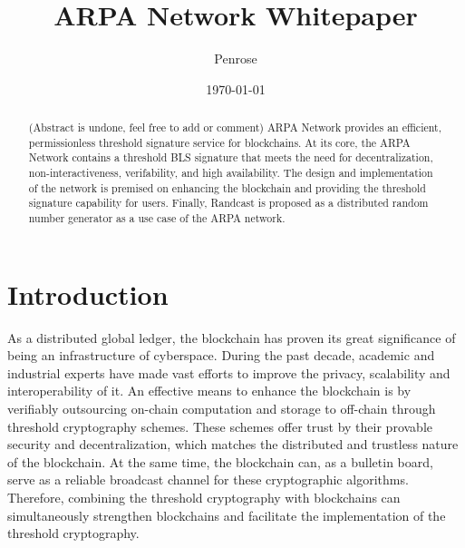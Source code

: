 \documentclass[11pt]{article}
\title{ARPA Network Whitepaper}
\author{Penrose}
\date{\today}
\begin{document}
\maketitle

\begin{abstract}
(Abstract is undone, feel free to add or comment) ARPA Network provides an efficient, permissionless threshold signature service for blockchains. At its core, the ARPA Network contains a threshold BLS signature that meets the need for decentralization, non-interactiveness, verifability, and high availability. The design and implementation of the network is premised on enhancing the blockchain and providing the threshold signature capability for users. Finally, Randcast is proposed as a distributed random number generator as a use case of the ARPA network. 

\end{abstract}

\section{Introduction}
As a distributed global ledger, the blockchain has proven its great significance of being an infrastructure of cyberspace. During the past decade, academic and industrial experts have made vast efforts to improve the privacy, scalability and interoperability of it. An effective means to enhance the blockchain is by verifiably outsourcing on-chain computation and storage to off-chain through threshold cryptography schemes. These schemes offer trust by their provable security and decentralization, which matches the distributed and trustless nature of the blockchain. At the same time, the blockchain can, as a bulletin board, serve as a reliable broadcast channel for these cryptographic algorithms. Therefore, combining the threshold cryptography with blockchains can simultaneously strengthen blockchains and facilitate the implementation of the threshold cryptography.
\end{document}

